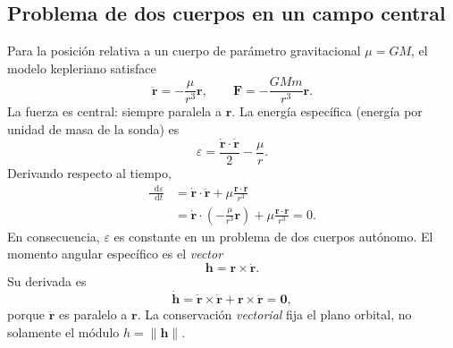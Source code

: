 \documentclass[11pt,a4paper]{article}
\newcommand{\vect}[1]{\bm{#1}}
\newcommand{\dif}{\mathop{}\!\mathrm{d}}
\begin{document}
\subsection{Problema de dos cuerpos en un campo central}
Para la posición relativa a un cuerpo de parámetro gravitacional $\mu=GM$, el modelo kepleriano satisface
\begin{equation}\label{eq:kepler}
\ddot{\vect r}=-\frac{\mu}{r^3}\vect r,\qquad
\vect F=-\frac{GMm}{r^3}\vect r.
\end{equation}
La fuerza es central: siempre paralela a $\vect r$. La energía específica (energía por unidad de masa de la sonda) es
\begin{equation}\label{eq:energy}
\varepsilon=\frac{\dot{\vect r}\cdot\dot{\vect r}}2-\frac{\mu}{r}.
\end{equation}
Derivando respecto al tiempo,
\begin{align}
\frac{\dif\varepsilon}{\dif t}
 &=\dot{\vect r}\cdot\ddot{\vect r}+\mu\frac{\vect r\cdot\dot{\vect r}}{r^3}\\
 &=\dot{\vect r}\cdot\left(-\frac\mu{r^3}\vect r\right)
 +\mu\frac{\vect r\cdot\dot{\vect r}}{r^3}=0.
\end{align}
En consecuencia, $\varepsilon$ es constante en un problema de dos cuerpos autónomo. El momento angular específico es el \emph{vector}
\begin{equation}\label{eq:h}
\vect h=\vect r\times\dot{\vect r}.
\end{equation}
Su derivada es
\begin{equation}
\dot{\vect h}=\dot{\vect r}\times\dot{\vect r}+
\vect r\times\ddot{\vect r}=\vect 0,
\end{equation}
porque $\ddot{\vect r}$ es paralelo a $\vect r$. La conservación \emph{vectorial} fija el plano orbital, no solamente el módulo $h=\lVert\vect h\rVert$.
\end{document}
